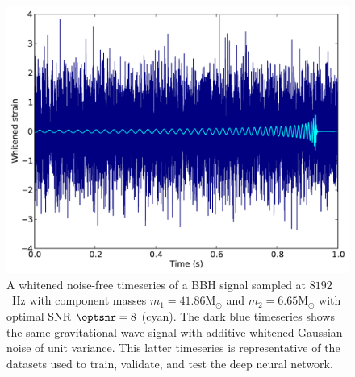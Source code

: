 %
%


\begin{figure} 
\includegraphics[width=\columnwidth]{figures/waveform.pdf}
\caption[Whitened noise-free timeseries of a \ac{BBH} signal]{A whitened noise-free timeseries of a \ac{BBH} signal sampled at $8192$~Hz with component masses $m_{1}=41.86\mathrm{M}_{\odot}$ and $m_{2}=6.65\mathrm{M}_{\odot}$ with optimal \ac{SNR} $\optsnr=8$ (cyan). The dark blue timeseries shows the same gravitational-wave signal with additive whitened Gaussian noise of unit variance. This latter timeseries is representative of the datasets used to train, validate, and test the deep neural network.\label{fig:waveform}}
\end{figure}

